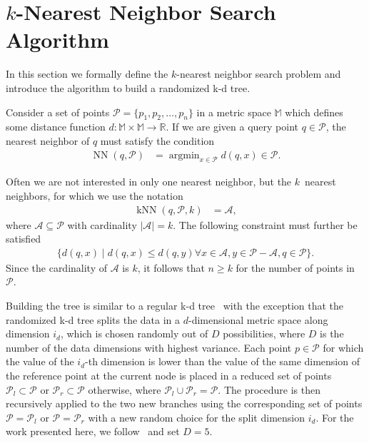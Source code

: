 \section{$k$-Nearest Neighbor Search Algorithm}
  \label{sec:_k_nearest_neighbor_search_algorithm}

  In this section we formally define the $k$-nearest neighbor search problem 
  and introduce the algorithm to build a randomized k-d tree.

   Consider a set of points $\mathcal{P} 
  = \{p_1,p_2,\dots,p_n\}$ in a metric space $\mathbb{M}$ which defines some 
  distance function $d\colon\mathbb{M}\times\mathbb{M}\to\mathbb{R}$.  If we 
  are given a query point $q\in\mathcal{P}$, the nearest neighbor of $q$ must 
  satisfy the condition
  \begin{align}
    \label{eq:NN}
    \operatorname{NN}(q,\mathcal{P}) &= \operatorname{argmin}_{x\in\mathcal{P}} 
    d(q,x)\in\mathcal{P}.
  \end{align}

  Often we are not interested in only one nearest neighbor, but the $k$~nearest 
  neighbors, for which we use the notation
  \begin{align}
    \label{eq:kNN}
    \operatorname{kNN}(q,\mathcal{P},k) &= \mathcal{A},
  \end{align}
  where $\mathcal{A}\subseteq\mathcal{P}$ with cardinality 
  $\vert\mathcal{A}\vert = k$.  The following constraint must further be 
  satisfied
  \begin{align}
    \label{eq:constraint_kNN}
    \{d(q,x)\mid d(q,x)\leq d(q,y)\forall x\in\mathcal{A}, 
    y\in\mathcal{P}-\mathcal{A},q\in\mathcal{P}\}.
  \end{align}
  Since the cardinality of $\mathcal{A}$ is $k$, it follows that $n\geq k$ for 
  the number of points in $\mathcal{P}$.

   Building the tree is similar to a regular 
  k-d tree~\cite{bentley1975a,friedman1977a} with the exception that the 
  randomized k-d tree splits the data in a $d$-dimensional metric space along 
  dimension $i_d$, which is chosen randomly out of $D$ possibilities, where $D$ 
  is the number of the data dimensions with highest variance.  Each point 
  $p\in\mathcal{P}$ for which the value of the $i_d$-th dimension is lower than 
  the value of the same dimension of the reference point at the current node is 
  placed in a reduced set of points $\mathcal{P}_l\subset\mathcal{P}$ or 
  $\mathcal{P}_r\subset\mathcal{P}$ otherwise, where 
  $\mathcal{P}_l\cup\mathcal{P}_r = \mathcal{P}$.
  The procedure is then recursively applied to the two new branches using the 
  corresponding set of points $\mathcal{P}=\mathcal{P}_l$ or 
  $\mathcal{P}=\mathcal{P}_r$ with a new random choice for the split dimension 
  $i_d$.  For the work presented here, we follow~\cite{muja2009a} and set 
  $D=5$.


